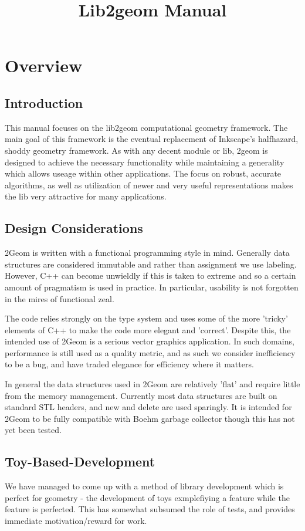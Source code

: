\documentclass{book}
\title{Lib2geom Manual}
\begin{document}
\chapter{Overview}

\section{Introduction}

This manual focuses on the lib2geom computational geometry framework.
The main goal of this framework is the eventual replacement of
Inkscape's halfhazard, shoddy geometry framework. As with any decent
module or lib, 2geom is designed to achieve the necessary functionality
while maintaining a generality which allows useage within other
applications.  The focus on robust, accurate algorithms, as well as
utilization of newer and very useful representations makes the lib
very attractive for many applications.

\section{Design Considerations}
2Geom is written with a functional programming style in mind.
Generally data structures are considered immutable and rather than
assignment we use labeling.  However, C++ can become unwieldly if
this is taken to extreme and so a certain amount of pragmatism is
used in practice.  In particular, usability is not forgotten in the
mires of functional zeal.

The code relies strongly on the type system and uses some of the more
'tricky' elements of C++ to make the code more elegant and 'correct'.
Despite this, the intended use of 2Geom is a serious vector graphics
application. In such domains, performance is still used as a quality
metric, and as such we consider inefficiency to be a bug, and have
traded elegance for efficiency where it matters.

In general the data structures used in 2Geom are relatively 'flat'
and require little from the memory management.  Currently most data
structures are built on standard STL headers\cite{stl}, and new and
delete are used sparingly.  It is intended for 2Geom to be fully
compatible with Boehm garbage collector\cite{boehm} though this has
not yet been tested.

\section{Toy-Based-Development}
We have managed to come up with a method of library development
which is perfect for geometry - the development of toys exmplefiying
a feature while the feature is perfected.  This has somewhat subsumed
the role of tests, and provides immediate motivation/reward for work.
\end{document}
